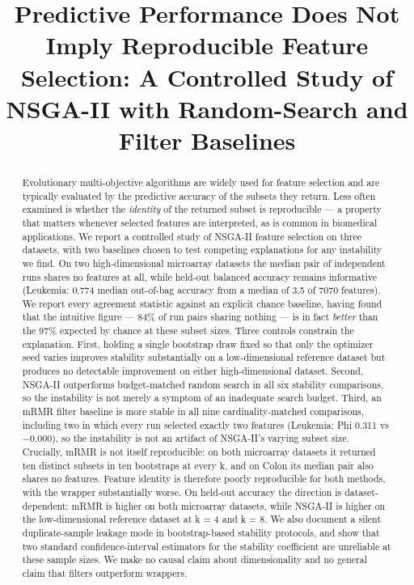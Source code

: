 \documentclass[conference]{IEEEtran}
\begin{document}
\title{Predictive Performance Does Not Imply Reproducible Feature Selection: A Controlled Study of NSGA-II with Random-Search and Filter Baselines}
\author{
}
\maketitle

\begin{abstract}
Evolutionary multi-objective algorithms are widely used for feature selection and are typically evaluated by the predictive accuracy of the subsets they return. Less often examined is whether the \emph{identity} of the returned subset is reproducible --- a property that matters whenever selected features are interpreted, as is common in biomedical applications. We report a controlled study of NSGA-II feature selection on three datasets, with two baselines chosen to test competing explanations for any instability we find. On two high-dimensional microarray datasets the median pair of independent runs shares no features at all, while held-out balanced accuracy remains informative (Leukemia: 0.774 median out-of-bag accuracy from a median of 3.5 of 7070 features). We report every agreement statistic against an explicit chance baseline, having found that the intuitive figure --- 84\% of run pairs sharing nothing --- is in fact \emph{better} than the 97\% expected by chance at these subset sizes. Three controls constrain the explanation. First, holding a single bootstrap draw fixed so that only the optimizer seed varies improves stability substantially on a low-dimensional reference dataset but produces no detectable improvement on either high-dimensional dataset. Second, NSGA-II outperforms budget-matched random search in all six stability comparisons, so the instability is not merely a symptom of an inadequate search budget. Third, an mRMR filter baseline is more stable in all nine cardinality-matched comparisons, including two in which every run selected exactly two features (Leukemia: Phi 0.311 vs $-$0.000), so the instability is not an artifact of NSGA-II's varying subset size. Crucially, mRMR is not itself reproducible: on both microarray datasets it returned ten distinct subsets in ten bootstraps at every k, and on Colon its median pair also shares no features. Feature identity is therefore poorly reproducible for both methods, with the wrapper substantially worse. On held-out accuracy the direction is dataset-dependent: mRMR is higher on both microarray datasets, while NSGA-II is higher on the low-dimensional reference dataset at k = 4 and k = 8. We also document a silent duplicate-sample leakage mode in bootstrap-based stability protocols, and show that two standard confidence-interval estimators for the stability coefficient are unreliable at these sample sizes. We make no causal claim about dimensionality and no general claim that filters outperform wrappers.
\end{abstract}
\end{document}
